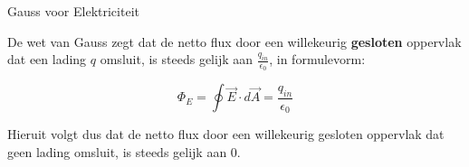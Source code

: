 \begin{lem}{Gauss voor Elektriciteit}

    De wet van Gauss zegt dat de netto flux door een willekeurig \textbf{gesloten} oppervlak dat een lading $ q $ omsluit, is steeds gelijk aan $ \tfrac{q_{in}}{\epsilon_0} $, in formulevorm:
    
    \begin{equation*}
        \Phi_E = \oint \Vec{E}\cdot d\Vec{A} = \dfrac{q_{in}}{\epsilon_0}
    \end{equation*}
    
    \noindent Hieruit volgt dus dat de netto flux door een willekeurig gesloten oppervlak dat geen lading omsluit, is steeds gelijk aan 0. 
\end{lem}





